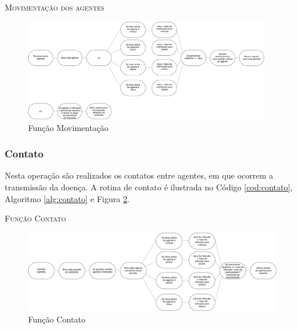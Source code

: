 \begin{algorithm}[H]
  \SetAlgoLined   
  
  \caption{\textsc{Movimentação dos agentes}}
  \label{alg:movimentacao}
\end{algorithm}

\begin{figure}[H]
  \centering
  \includegraphics[width=0.95\textwidth]{Figuras/EstruturasDadosEstrategias/Operadores/Movimentacao.eps}
  \caption{Função Movimentação}
  \label{fig:movimentacao}
\end{figure} 

\newpage

\subsubsection{Contato}

Nesta operação são realizados os contatos entre agentes, em que ocorrem a transmissão da doença. A rotina de contato é ilustrada no Código \ref{cod:contato}, Algoritmo \ref{alg:contato} e Figura \ref{fig:contato}. 



\begin{algorithm}[H]
 \SetAlgoLined  
 
 \caption{\textsc{Função Contato}} 
 \label{alg:contato}
\end{algorithm}

\begin{figure}[H]
  \centering
  \includegraphics[width=1\textwidth]{Figuras/EstruturasDadosEstrategias/Operadores/Contato.eps}
  \caption{Função Contato}
  \label{fig:contato}
\end{figure} 

